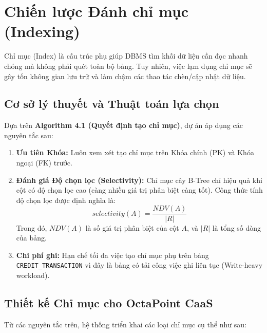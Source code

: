 \section{Chiến lược Đánh chỉ mục (Indexing)}

Chỉ mục (Index) là cấu trúc phụ giúp DBMS tìm khối dữ liệu cần đọc nhanh chóng mà không phải quét toàn bộ bảng. Tuy nhiên, việc lạm dụng chỉ mục sẽ gây tốn không gian lưu trữ và làm chậm các thao tác chèn/cập nhật dữ liệu.

\subsection{Cơ sở lý thuyết và Thuật toán lựa chọn}
Dựa trên \textbf{Algorithm 4.1 (Quyết định tạo chỉ mục)}, dự án áp dụng các nguyên tắc sau:
\begin{enumerate}
    \item \textbf{Ưu tiên Khóa:} Luôn xem xét tạo chỉ mục trên Khóa chính (PK) và Khóa ngoại (FK) trước.
    \item \textbf{Đánh giá Độ chọn lọc (Selectivity):} Chỉ mục cây B-Tree chỉ hiệu quả khi cột có độ chọn lọc cao (càng nhiều giá trị phân biệt càng tốt). Công thức tính độ chọn lọc được định nghĩa là:
    $$selectivity(A)=\frac{NDV(A)}{|R|}$$
    Trong đó, $NDV(A)$ là số giá trị phân biệt của cột $A$, và $|R|$ là tổng số dòng của bảng.
    \item \textbf{Chi phí ghi:} Hạn chế tối đa việc tạo chỉ mục phụ trên bảng \texttt{CREDIT\_TRANSACTION} vì đây là bảng có tải công việc ghi liên tục (Write-heavy workload).
\end{enumerate}

\subsection{Thiết kế Chỉ mục cho OctaPoint CaaS}
Từ các nguyên tắc trên, hệ thống triển khai các loại chỉ mục cụ thể như sau:

